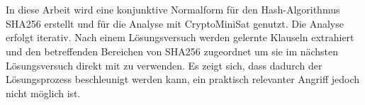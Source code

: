 \section*{\abstractname}

In diese Arbeit wird eine konjunktive Normalform für den Hash-Algorithmus SHA256 erstellt und für
die Analyse mit CryptoMiniSat genutzt. Die Analyse erfolgt iterativ. Nach einem Lösungsversuch werden
gelernte Klauseln extrahiert und den betreffenden Bereichen von SHA256 zugeordnet um sie im nächsten
Lösungsversuch direkt mit zu verwenden. Es zeigt sich, dass dadurch der Lösungsprozess beschleunigt
werden kann, ein praktisch relevanter Angriff jedoch nicht möglich ist.
